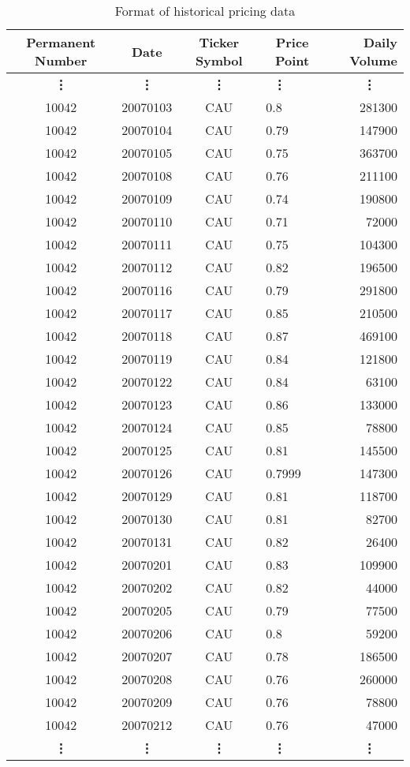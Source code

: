 \begin{table}[p]
\centering
\begin{tabular}{@{}clclr@{}}
\toprule\toprule
Permanent Number & \multicolumn{1}{c}{Date} & Ticker Symbol & \multicolumn{1}{c}{Price Point} & Daily Volume \\\midrule
\multicolumn{1}{c}{\bf\vdots} & \multicolumn{1}{c}{\bf\vdots} & \multicolumn{1}{c}{\bf\vdots} & \multicolumn{1}{l}{\bf\ \vdots\ \ } & \multicolumn{1}{r}{\bf\vdots\ \ \ } \\
10042 & 20070103 & CAU & 0.8    & 281300 \\ 
10042 & 20070104 & CAU & 0.79   & 147900 \\
10042 & 20070105 & CAU & 0.75   & 363700 \\
10042 & 20070108 & CAU & 0.76   & 211100 \\
10042 & 20070109 & CAU & 0.74   & 190800 \\
10042 & 20070110 & CAU & 0.71   & 72000  \\
10042 & 20070111 & CAU & 0.75   & 104300 \\
10042 & 20070112 & CAU & 0.82   & 196500 \\
10042 & 20070116 & CAU & 0.79   & 291800 \\
10042 & 20070117 & CAU & 0.85   & 210500 \\
10042 & 20070118 & CAU & 0.87   & 469100 \\
10042 & 20070119 & CAU & 0.84   & 121800 \\
10042 & 20070122 & CAU & 0.84   & 63100  \\
10042 & 20070123 & CAU & 0.86   & 133000 \\
10042 & 20070124 & CAU & 0.85   & 78800  \\
10042 & 20070125 & CAU & 0.81   & 145500 \\
10042 & 20070126 & CAU & 0.7999 & 147300 \\
10042 & 20070129 & CAU & 0.81   & 118700 \\
10042 & 20070130 & CAU & 0.81   & 82700  \\
10042 & 20070131 & CAU & 0.82   & 26400  \\
10042 & 20070201 & CAU & 0.83   & 109900 \\
10042 & 20070202 & CAU & 0.82   & 44000  \\
10042 & 20070205 & CAU & 0.79   & 77500  \\
10042 & 20070206 & CAU & 0.8    & 59200  \\
10042 & 20070207 & CAU & 0.78   & 186500 \\
10042 & 20070208 & CAU & 0.76   & 260000 \\
10042 & 20070209 & CAU & 0.76   & 78800  \\
10042 & 20070212 & CAU & 0.76   & 47000  \\ 
\multicolumn{1}{c}{\bf\vdots} & \multicolumn{1}{c}{\bf\vdots} & \multicolumn{1}{c}{\bf\vdots} & \multicolumn{1}{l}{\bf\ \vdots\ \ } & \multicolumn{1}{r}{\bf\vdots\ \ \ } \\
\bottomrule
\end{tabular}
\caption{Format of historical pricing data}
\label{tab:histPrice}
\end{table}

